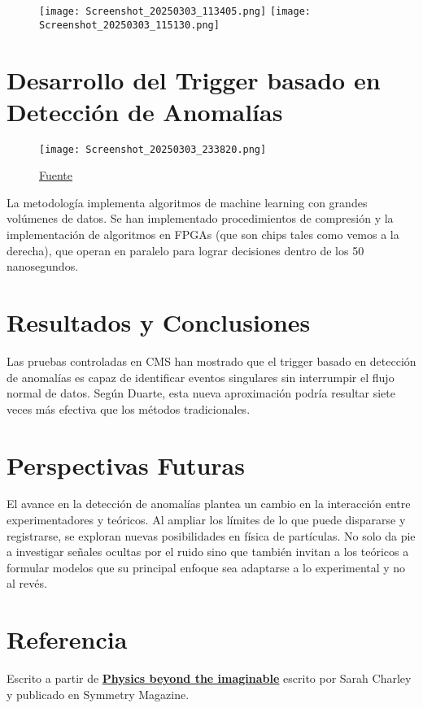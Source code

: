\documentclass[a4paper,12pt]{article}
\begin{document}
\begin{figure}[h]
    \centering
    \texttt{[image: Screenshot\_20250303\_113405.png]}
    \texttt{[image: Screenshot\_20250303\_115130.png]}
\end{figure}

\section{Desarrollo del Trigger basado en Detección de Anomalías}

\begin{wrapfigure}{r}{0.35\columnwidth}
    \vspace{-35pt}
    \texttt{[image: Screenshot\_20250303\_233820.png]}
    \caption{\href{https://commons.wikimedia.org/wiki/File:Altera_StratixIVGX_FPGA.jpg}{Fuente}}
    \vspace{-30pt}
\end{wrapfigure}
La metodología implementa algoritmos de machine learning con grandes volúmenes de datos. Se han implementado procedimientos de compresión y la implementación de algoritmos en FPGAs (que son chips tales como vemos a la derecha), que operan en paralelo para lograr decisiones dentro de los 50 nanosegundos.

\vskip 1cm

\section{Resultados y Conclusiones}
Las pruebas controladas en CMS han mostrado que el trigger basado en detección de anomalías es capaz de identificar eventos singulares sin interrumpir el flujo normal de datos. Según Duarte, esta nueva aproximación podría resultar siete veces más efectiva que los métodos tradicionales.

\section{Perspectivas Futuras}
El avance en la detección de anomalías plantea un cambio en la interacción entre experimentadores y teóricos. Al ampliar los límites de lo que puede dispararse y registrarse, se exploran nuevas posibilidades en física de partículas. No solo da pie a investigar señales ocultas por el ruido sino que también invitan a los teóricos a formular modelos que su principal enfoque sea adaptarse a lo experimental y no al revés.

\section{Referencia}
Escrito a partir de \href{https://www.symmetrymagazine.org/article/physics-beyond-the-imaginable?language_content_entity=und}{\textbf{Physics beyond the imaginable}} escrito por Sarah Charley y publicado en Symmetry Magazine.
\end{document}
